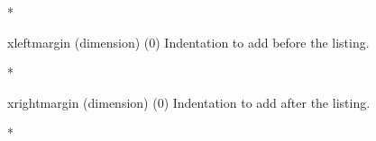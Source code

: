 \begin{paracol}{2}
\begin{optionlist}
\switchcolumn[0]*%
  \item[xleftmargin (dimension) (0)]
    Indentation to add before the listing.
    \switchcolumn

\switchcolumn[0]*%
  \item[xrightmargin (dimension) (0)]
    Indentation to add after the listing.
    \switchcolumn

\switchcolumn[0]*%

\end{optionlist}



\end{paracol}